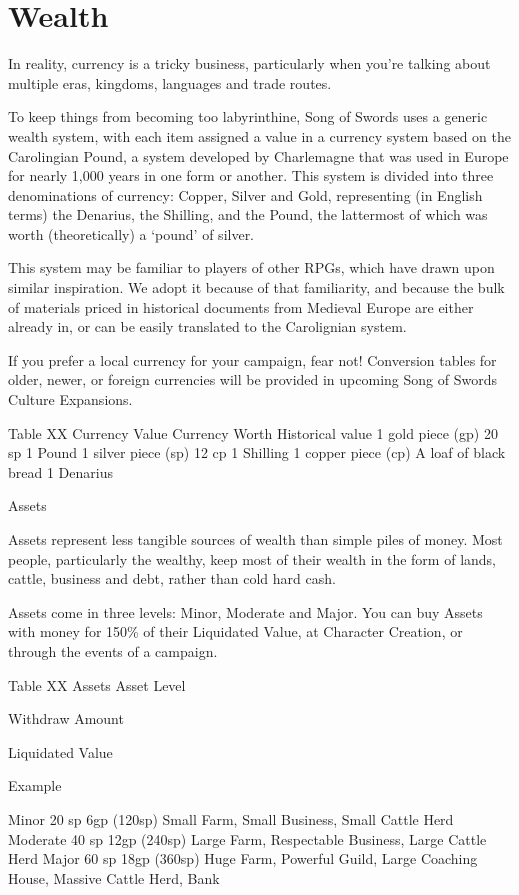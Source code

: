 \documentclass[oneside,11pt,english]{book}
\begin{document}
\section{Wealth}
In reality, currency is a tricky business, particularly when you're talking about multiple eras, kingdoms, 
languages and trade routes.


To keep things from becoming too labyrinthine, Song of Swords uses a generic wealth system, with each item assigned a value in a currency system based on the Carolingian Pound, a system developed by Charlemagne that was used in Europe for nearly 1,000 years in one form or another. This system is divided into three denominations of currency: Copper, Silver and Gold, representing (in English terms) the Denarius, the Shilling, and the Pound, the lattermost of which was worth (theoretically) a ‘pound’ of silver.


This system may be familiar to players of other RPGs, which have drawn upon similar inspiration. We adopt it because of that familiarity, and because the bulk of materials priced in historical documents from Medieval Europe are either already in, or can be easily translated to the Carolignian system.


If you prefer a local currency for your campaign, fear not! Conversion tables for older, newer, or foreign currencies will be provided in upcoming Song of Swords Culture Expansions.


Table XX Currency Value 
Currency Worth Historical value 
1 gold piece (gp) 20 sp 1 Pound 
1 silver piece (sp) 12 cp 1 Shilling 
1 copper piece (cp) A loaf of black bread 1 Denarius 

 

Assets 

 
Assets represent less tangible sources of wealth than simple piles of money. Most people, particularly the 
wealthy, keep most of their wealth in the form of lands, cattle, business and debt, rather than cold hard 
cash. 

 


Assets come in three levels: Minor, Moderate and Major. You can buy Assets with money for 150\% of 
their Liquidated Value, at Character Creation, or through the events of a campaign. 

 
Table XX Assets 
Asset 
Level 

Withdraw 
Amount 

Liquidated 
Value 

Example 

Minor 20 sp 6gp (120sp) Small Farm, Small Business, Small Cattle Herd 
Moderate 40 sp 12gp (240sp) Large Farm, Respectable Business, Large Cattle Herd 
Major 60 sp 18gp (360sp) Huge Farm, Powerful Guild, Large Coaching House, Massive 
Cattle Herd, Bank 
\end{document}
